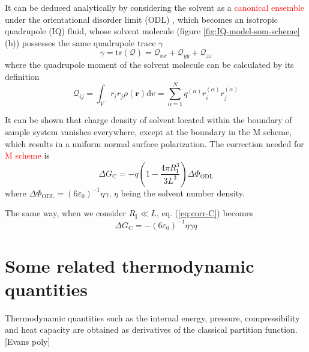 It can be deduced analytically by considering the solvent as a \textcolor{red}{canonical
ensemble} under the orientational disorder limit (ODL) \citep{Kastenholz_2006_I},
which becomes an isotropic quadrupole (IQ) fluid, whose solvent molecule
(figure \ref{fig:IQ-model-som-scheme} (b)) possesses the same quadrupole
trace $\gamma$ 
\begin{equation}
\gamma=\mathrm{tr}(\mathbf{\mathcal{Q}})=\mathcal{Q}_{xx}+\mathcal{Q}_{yy}+\mathcal{Q}_{zz}
\end{equation}
where the quadrupole moment of the solvent molecule can be calculated
by its definition \citep{Multipole}
\begin{equation}
\mathcal{Q}_{ij}=\int_{V}r_{i}r_{j}\rho(\mathbf{r})\mathrm{d}v=\sum_{\alpha=1}^{N}q^{(\alpha)}r_{i}^{(\alpha)}r_{j}^{(\alpha)}
\end{equation}


It can be shown that charge density of solvent located within the
boundary of sample system vanishes everywhere, except at the boundary
in the M scheme, which results in a uniform normal surface polarization.
The correction needed for\textcolor{red}{{} M scheme }is
\begin{equation}
\Delta G_{\mathrm{C}}=-q\left(1-\frac{4\pi R_{\mathrm{I}}^{3}}{3L^{3}}\right)\Delta\Phi_{\mathrm{ODL}}\label{eq:corr-C}
\end{equation}
where $\Delta\Phi_{\mathrm{ODL}}=\left(6\varepsilon_{0}\right)^{-1}\eta\gamma$,
$\eta$ being the solvent number density.

The same way, when we consider $R_{\mathrm{I}}\ll L$, eq. (\ref{eq:corr-C})
becomes
\begin{equation}
\Delta G_{\mathrm{C}}=-\left(6\varepsilon_{0}\right)^{-1}\eta\gamma q
\end{equation}



\section{Some related thermodynamic quantities}

Thermodynamic quantities such as the internal energy, pressure, compressibility
and heat capacity are obtained as derivatives of the classical partition
function. {[}Evans poly{]}

